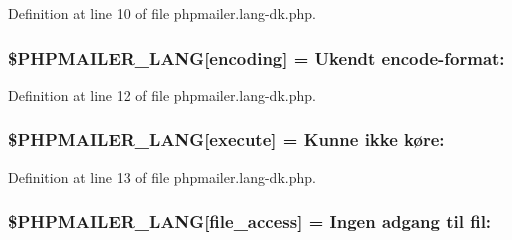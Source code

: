 Definition at line 10 of file phpmailer.\+lang-\/dk.\+php.

\subsubsection[{\texorpdfstring{\$\+P\+H\+P\+M\+A\+I\+L\+E\+R\+\_\+\+L\+A\+NG}{$PHPMAILER_LANG}}]{\setlength{\rightskip}{0pt plus 5cm}\$P\+H\+P\+M\+A\+I\+L\+E\+R\+\_\+\+L\+A\+NG\mbox{[}\textquotesingle{}encoding\textquotesingle{}\mbox{]} = \textquotesingle{}Ukendt encode-\/format\+: \textquotesingle{}}\hypertarget{phpmailer_8lang-dk_8php_a817f7283f3d54c970a0c10305cc668cc}{}\label{phpmailer_8lang-dk_8php_a817f7283f3d54c970a0c10305cc668cc}


Definition at line 12 of file phpmailer.\+lang-\/dk.\+php.

\subsubsection[{\texorpdfstring{\$\+P\+H\+P\+M\+A\+I\+L\+E\+R\+\_\+\+L\+A\+NG}{$PHPMAILER_LANG}}]{\setlength{\rightskip}{0pt plus 5cm}\$P\+H\+P\+M\+A\+I\+L\+E\+R\+\_\+\+L\+A\+NG\mbox{[}\textquotesingle{}execute\textquotesingle{}\mbox{]} = \textquotesingle{}Kunne ikke køre\+: \textquotesingle{}}\hypertarget{phpmailer_8lang-dk_8php_a668217a9563a168f30f2a8548b6ed5a9}{}\label{phpmailer_8lang-dk_8php_a668217a9563a168f30f2a8548b6ed5a9}


Definition at line 13 of file phpmailer.\+lang-\/dk.\+php.

\subsubsection[{\texorpdfstring{\$\+P\+H\+P\+M\+A\+I\+L\+E\+R\+\_\+\+L\+A\+NG}{$PHPMAILER_LANG}}]{\setlength{\rightskip}{0pt plus 5cm}\$P\+H\+P\+M\+A\+I\+L\+E\+R\+\_\+\+L\+A\+NG\mbox{[}\textquotesingle{}file\+\_\+access\textquotesingle{}\mbox{]} = \textquotesingle{}Ingen adgang til fil\+: \textquotesingle{}}\hypertarget{phpmailer_8lang-dk_8php_a7e83349023b856ef9e5c46e30ae6d51e}{}\label{phpmailer_8lang-dk_8php_a7e83349023b856ef9e5c46e30ae6d51e}


